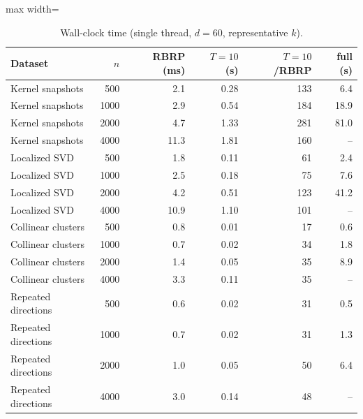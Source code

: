 \begin{table}[t]
\centering\small
\caption{Wall-clock time (single thread, $d=60$, representative $k$).}\label{tab:runtime}
\begin{adjustbox}{max width=\linewidth}
\begin{tabular}{lrrrrr}
\toprule
Dataset & $n$ & RBRP (ms) & $T{=}10$ (s) & $T{=}10$/RBRP & full (s) \\
\midrule
Kernel snapshots & 500 & 2.1 & 0.28 & 133 & 6.4 \\
Kernel snapshots & 1000 & 2.9 & 0.54 & 184 & 18.9 \\
Kernel snapshots & 2000 & 4.7 & 1.33 & 281 & 81.0 \\
Kernel snapshots & 4000 & 11.3 & 1.81 & 160 & -- \\
Localized SVD & 500 & 1.8 & 0.11 & 61 & 2.4 \\
Localized SVD & 1000 & 2.5 & 0.18 & 75 & 7.6 \\
Localized SVD & 2000 & 4.2 & 0.51 & 123 & 41.2 \\
Localized SVD & 4000 & 10.9 & 1.10 & 101 & -- \\
Collinear clusters & 500 & 0.8 & 0.01 & 17 & 0.6 \\
Collinear clusters & 1000 & 0.7 & 0.02 & 34 & 1.8 \\
Collinear clusters & 2000 & 1.4 & 0.05 & 35 & 8.9 \\
Collinear clusters & 4000 & 3.3 & 0.11 & 35 & -- \\
Repeated directions & 500 & 0.6 & 0.02 & 31 & 0.5 \\
Repeated directions & 1000 & 0.7 & 0.02 & 31 & 1.3 \\
Repeated directions & 2000 & 1.0 & 0.05 & 50 & 6.4 \\
Repeated directions & 4000 & 3.0 & 0.14 & 48 & -- \\
\bottomrule
\end{tabular}
\end{adjustbox}
\end{table}
